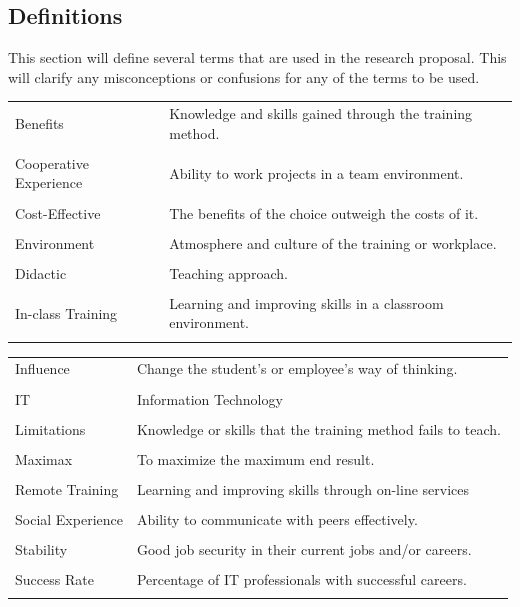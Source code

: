 \documentclass[titlepage]{article}
\begin{document}
\subsection{Definitions}
This section will define several terms that are used in the research proposal.  This will clarify
any misconceptions or confusions for any of the terms to be used.\\

\noindent \begin{tabularx}{\textwidth}{lX}
Benefits & Knowledge and skills gained through the training method.\\\\
Cooperative Experience & Ability to work projects in a team environment.\\\\
Cost-Effective & The benefits of the choice outweigh the costs of it.\\\\
Environment & Atmosphere and culture of the training or workplace.\\\\
Didactic & Teaching approach.\\\\
In-class Training & Learning and improving skills in a classroom environment.\\\\
\end{tabularx}

\noindent \begin{tabularx}{\textwidth}{lX}
Influence & Change the student's or employee's way of thinking.\\\\
IT & Information Technology \\\\
Limitations & Knowledge or skills that the training method fails to teach.\\\\
Maximax & To maximize the maximum end result.\\\\
Remote Training & Learning and improving skills through on-line services\\\\
Social Experience & Ability to communicate with peers effectively.\\\\
Stability & Good job security in their current jobs and/or careers.\\\\
Success Rate & Percentage of IT professionals with successful careers.\\\\
\end{tabularx}
\end{document}
